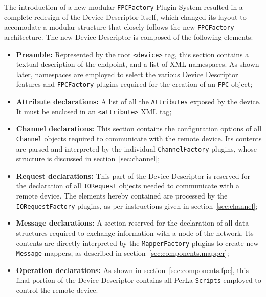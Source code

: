 The introduction of a new modular \texttt{FPCFactory} Plugin System resulted in
a complete redesign of the Device Descriptor itself, which changed its layout
to accomodate a modular structure that closely follows the new
\texttt{FPCFactory} architecture. The new Device Descriptor is composed of the
following elements:

\begin{itemize}

    \item \textbf{Preamble:} Represented by the root \lstinline!<device>! tag,
        this section contains a textual description of the endpoint, and a list
        of XML namespaces. As shown later, namespaces are employed to select
        the various Device Descriptor features and \texttt{FPCFactory} plugins
        required for the creation of an \texttt{FPC} object;

    \item \textbf{Attribute declarations:} A list of all the
        \texttt{Attributes} exposed by the device. It must be enclosed in an
        \lstinline!<attribute>! XML tag;

    \item \textbf{Channel declarations:} This section contains the
        configuration options of all \texttt{Channel} objects required to
        communicate with the remote device. Its contents are parsed and
        interpreted by the individual \texttt{ChannelFactory} plugins, whose
        structure is discussed in section~\ref{sec:channel};

    \item \textbf{Request declarations:} This part of the Device Descriptor is
        reserved for the declaration of all \texttt{IORequest} objects needed
        to communicate with a remote device. The elements hereby contained are
        processed by the \texttt{IORequestFactory} plugins, as per instructions
        given in section~\ref{sec:channel};

    \item \textbf{Message declarations:} A section reserved for the declaration
        of all data structures required to exchange information with a node of
        the network. Its contents are directly interpreted by the
        \texttt{MapperFactory} plugins to create new \texttt{Message}
        mappers, as described in section~\ref{sec:components.mapper};

    \item \textbf{Operation declarations:} As shown in
        section~\ref{sec:components.fpc}, this final portion of the Device
        Descriptor contains all PerLa \texttt{Scripts} employed to control the
        remote device.

\end{itemize}

